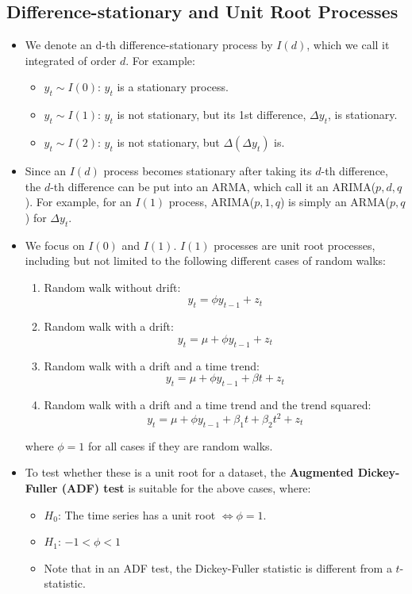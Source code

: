 \documentclass[notitlepage]{article}
\begin{document}
\subsection{Difference-stationary and Unit Root Processes}

\begin{itemize}
    \item We denote an d-th difference-stationary process by \(I(d)\), which we call it integrated of order \(d\). For example:
    \begin{itemize}
        \item \(y_t \sim I(0)\): \(y_t\) is a stationary process.
        \item \(y_t \sim I(1)\): \(y_t\) is not stationary, but its 1st difference, \(\Delta y_t\), is stationary.
        \item \(y_t \sim I(2)\): \(y_t\) is not stationary, but \(\Delta(\Delta y_t)\) is.
    \end{itemize}
    \item Since an \(I(d)\) process becomes stationary after taking its \(d\)-th difference, the \(d\)-th difference can be put into an ARMA, which call it an ARIMA(\(p,d,q\)). For example, for an \(I(1)\) process, ARIMA(\(p,1,q\)) is simply an ARMA(\(p,q\)) for \(\Delta y_t\).
    \item We focus on \(I(0)\) and \(I(1)\). \(I(1)\) processes are unit root processes, including but not limited to the following different cases of random walks:
    \begin{enumerate}
        \item Random walk without drift:
        \[
        y_t = \phi y_{t-1} + z_t
        \]
        \item Random walk with a drift:
        \[
        y_t = \mu + \phi y_{t-1} + z_t
        \]
        \item Random walk with a drift and a time trend:
        \[
        y_t = \mu + \phi y_{t-1} + \beta t + z_t
        \]
        \item Random walk with a drift and a time trend and the trend squared:
        \[
        y_t = \mu + \phi y_{t-1} + \beta_1 t + \beta_2 t^2 + z_t
        \]
    \end{enumerate}
    where \(\phi=1\) for all cases if they are random walks.
    \item To test whether these is a unit root for a dataset, the \textbf{Augmented Dickey-Fuller (ADF) test} is suitable for the above cases, where:
    \begin{itemize}
        \item \(H_0\): The time series has a unit root \(\iff \phi=1\).
        \item \(H_1\): \(-1<\phi<1\)
        \item Note that in an ADF test, the Dickey-Fuller statistic is different from a \(t\)-statistic. 
    \end{itemize}


\end{itemize}
\end{document}
